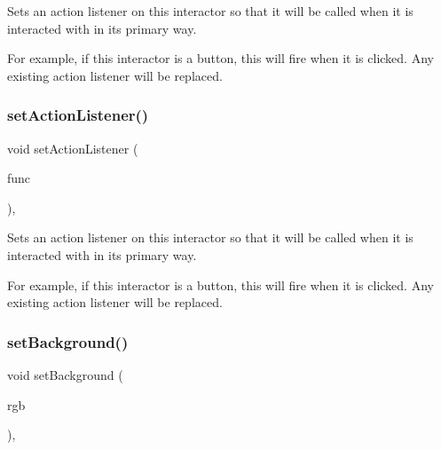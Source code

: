 Sets an action listener on this interactor so that it will be called when it is interacted with in its primary way. 

For example, if this interactor is a button, this will fire when it is clicked. Any existing action listener will be replaced. \mbox{\label{classGInteractor_aebd20a89c7a8a43a6fce999cf4f9fcf2}} 
\subsubsection{\texorpdfstring{set\+Action\+Listener()}{setActionListener()}\hspace{0.1cm}{\footnotesize\ttfamily [2/2]}}
{\footnotesize\ttfamily void set\+Action\+Listener (\begin{DoxyParamCaption}\item[{G\+Event\+Listener\+Void}]{func }\end{DoxyParamCaption})\hspace{0.3cm}{\ttfamily [virtual]}, {\ttfamily [inherited]}}



Sets an action listener on this interactor so that it will be called when it is interacted with in its primary way. 

For example, if this interactor is a button, this will fire when it is clicked. Any existing action listener will be replaced. \mbox{\label{classGInteractor_acba7e546c2025c0a15ca4b4cc92043db}} 
\subsubsection{\texorpdfstring{set\+Background()}{setBackground()}\hspace{0.1cm}{\footnotesize\ttfamily [1/2]}}
{\footnotesize\ttfamily void set\+Background (\begin{DoxyParamCaption}\item[{int}]{rgb }\end{DoxyParamCaption})\hspace{0.3cm}{\ttfamily [virtual]}, {\ttfamily [inherited]}}



